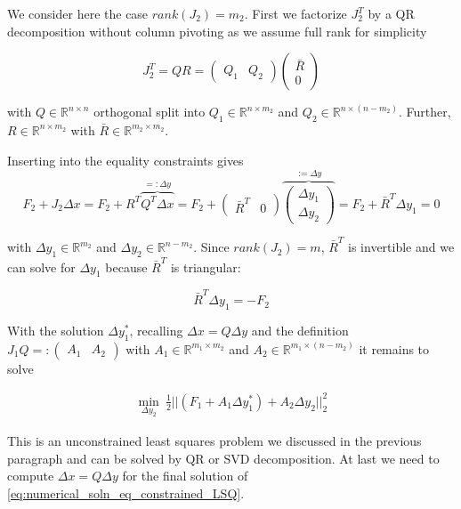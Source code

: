 \documentclass{scrartcl}[12pt, halfparskip]
\numberwithin{equation}{section}
\numberwithin{figure}{section}
\numberwithin{table}{section}
\begin{document}
We consider here the case $rank(J_2)=m_2$. First we factorize $J_2^T$ by a QR decomposition without column pivoting as we assume full rank for simplicity

\begin{equation}
	J_2^T = Q R = 
	\begin{pmatrix}
		Q_1 & Q_2
	\end{pmatrix}
	\begin{pmatrix}
		\bar{R} \\
		0
	\end{pmatrix}
\end{equation}

with $Q \in \mathbb{R}^{n \times n}$ orthogonal split into $Q_1 \in \mathbb{R}^{n \times m_2}$ and $Q_2 \in \mathbb{R}^{n \times (n-m_2)}$. Further, $R \in \mathbb{R}^{n \times m_2}$ with $\bar{R} \in \mathbb{R}^{m_2 \times m_2}$.

Inserting into the equality constraints gives
\begin{equation}
	F_2 + J_2 \Delta x = F_2 + R^T \overbrace{Q^T \Delta x}^{=: \Delta y} = F_2 +
	\begin{pmatrix}
		\bar{R}^T & 0
	\end{pmatrix} 
	\overbrace{
	\begin{pmatrix}
		\Delta y_1 \\
		\Delta y_2
	\end{pmatrix}}^{:= \Delta y} = F_2 + \bar{R}^T \Delta y_1 = 0
\end{equation}

with $\Delta y_1 \in \mathbb{R}^{m_2}$ and $\Delta y_2 \in \mathbb{R}^{n-m_2}$. Since $rank(J_2)=m$, $\bar{R}^T$ is invertible and we can solve for $\Delta y_1$ because $\bar{R}^T$ is triangular:

\begin{equation}
	\bar{R}^T \Delta y_1 = -F_2
\end{equation}

With the solution $\Delta y_1^*$, recalling $\Delta x = Q \Delta y$ and the definition $J_1 Q =: \begin{pmatrix} A_1 & A_2 \end{pmatrix}$ with $A_1 \in \mathbb{R}^{m_1 \times m_2}$ and $A_2 \in \mathbb{R}^{m_1 \times (n-m_2)}$ it remains to solve

\begin{align}
	\min_{\Delta y_2} \ \frac{1}{2} || (F_1 + A_1 \Delta y_1^*) + A_2 \Delta y_2 ||_2^2
\end{align}

This is an unconstrained least squares problem we discussed in the previous paragraph and can be solved by QR or SVD decomposition. At last we need to compute $\Delta x = Q \Delta y$ for the final solution of \cref{eq:numerical_soln_eq_constrained_LSQ}. \\
\end{document}
